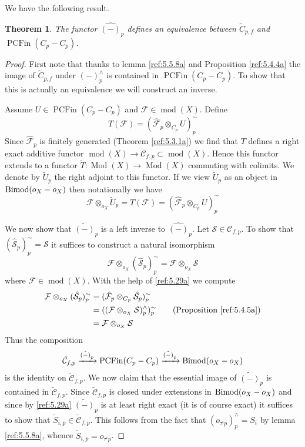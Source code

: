 \documentclass{amsproc}
\def\Cscr{{\mathcal C}}
\def\Fscr{{\mathcal F}}
\def\Sscr{{\mathcal S}}
\def\Bimod{\mathop{\text{Bimod}}}
\def\coh{\operatorname {mod}}
\def\Qch{\operatorname {Mod}}
\def\r{\rightarrow}
\let\oldtext\text
\def\text#1{\oldtext{\upshape #1}}
\DeclareMathOperator{\PCFin}{PCFin}
\newtheorem{theorems}[lemmas]{Theorem}
\theoremstyle{definition}
\theoremstyle{remark}
\numberwithin{equation}{section}
\numberwithin{table}{section}
\numberwithin{figure}{section}
\begin{document}
We have the following result.
 \begin{theorems}
\label{ref:5.5.9a}
 The functor $\hat{(-)}_p$ defines an equivalence between
$\tilde{C}_{p,f}$ and $\PCFin(C_p-C_p)$.
\end{theorems}
\begin{proof} First note that thanks to lemma \ref{ref:5.5.8a} and
  Proposition \ref{ref:5.4.4a} the
image of $\tilde{C}_{p,f}$ under $(-)^\wedge_p$ is contained in
$\PCFin(C_p-C_p)$. To show that this is actually an equivalence we will
construct an inverse.

Assume $U\in \PCFin(C_p-C_p)$ and $\Fscr\in \coh(X)$. Define
\begin{equation}
\label{ref:5.28a}
T(\Fscr)=(\hat{\Fscr}_p\otimes_{C_p} U)^\sim_p
\end{equation}
Since $\hat{\Fscr}_p$ is finitely generated (Theorem \ref{ref:5.3.1a}) we find
that $T$ defines a right exact additive functor $\coh(X)\r
\Cscr_{f,p}\subset \coh(X)$. Hence this functor extends to a functor
$\tilde{T}:\Qch(X)\r \Qch(X)$ commuting with colimits. We denote by
$\tilde{U}_p$ the right adjoint to this functor. If we view $\tilde{U}_p$
as an object in $\Bimod(o_X-o_X)$ then
 notationally we have  \begin{equation}
\label{ref:5.29a}
\Fscr\otimes_{o_X}
\tilde{U}_p=T(\Fscr)=(\hat{\Fscr}_p\otimes_{C_p} U)^\sim_p 
\end{equation}


We now show that $\tilde{(-)}_p$ is a left inverse to $\hat{(-)}_p$. Let
$\Sscr\in \Cscr_{f,p}$. To show that $(\hat{\Sscr}_p)^\sim_p=\Sscr$ it
suffices to construct a natural isomorphism
\[
\Fscr\otimes_{o_X} (\hat{\Sscr}_p)^\sim_p=\Fscr\otimes_{o_X}\Sscr
\]
where $\Fscr\in\coh(X)$. With the help of \eqref{ref:5.29a} we compute
\begin{align*}
\Fscr\otimes_{o_X} (\hat{\Sscr}_p)^\sim_p&=
(\hat{\Fscr}_p\otimes_{C_p} \hat{\Sscr}_p)^\sim_p
\\
&=((\Fscr\otimes_{o_X} \Sscr)^\wedge_p)^\sim_p\qquad\text{(Proposition
  \ref{ref:5.4.5a})} \\
&=\Fscr\otimes_{o_X} \Sscr
\end{align*}
Thus the composition
\begin{equation}
\label{ref:5.30a}
\tilde{\Cscr}_{f,p}\xrightarrow{\hat{(-)}_p}
\PCFin(C_p-C_p)\xrightarrow{\tilde{(-)}_p}
\Bimod(o_X-o_X)
\end{equation}
is the identity on $\tilde{\Cscr}_{f,p}$.  We now claim that the
essential image of $\tilde{(-)}_p$ is contained in
$\tilde{\Cscr}_{f,p}$. Since $\tilde{\Cscr}_{f,p}$ is closed under
extensions in $\Bimod(o_X-o_X)$ and since by \eqref{ref:5.29a}
$\tilde{(-)}_p$ is at least right exact (it is of course exact) it
suffices to show that $\tilde{S}_{i,p}\in \tilde{\Cscr}_{f,p}$. This
follows from the fact that $(o_{\tau^i p})^\wedge_p=S_i$ by lemma
\ref{ref:5.5.8a}, whence $\tilde{S}_{i,p}=o_{\tau^i p}$.





\end{proof}
\end{document}
